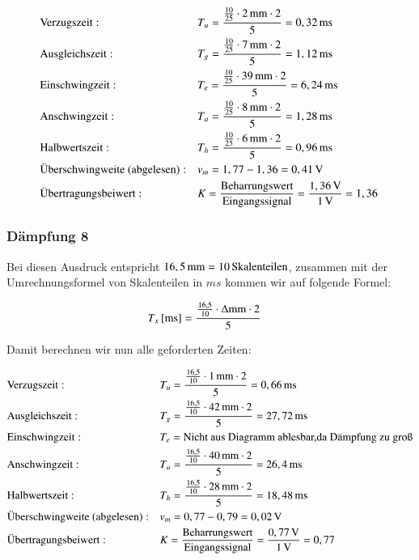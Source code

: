 \begin{align*}
&\text{Verzugszeit}:  &&T_u = \frac{ \frac{10}{25} \cdot \unit[2]{mm} \cdot 2}{5} = \unit[0,32]{ms} \\
&\text{Ausgleichszeit}:  &&T_g = \frac{ \frac{10}{25} \cdot \unit[7]{mm} \cdot 2}{5} = \unit[1,12]{ms} \\
&\text{Einschwingzeit}:  &&T_e = \frac{ \frac{10}{25} \cdot \unit[39]{mm} \cdot 2}{5} = \unit[6,24]{ms} \\
&\text{Anschwingzeit}:  &&T_a = \frac{ \frac{10}{25} \cdot \unit[8]{mm} \cdot 2}{5} = \unit[1,28]{ms} \\
&\text{Halbwertszeit}:  &&T_h = \frac{ \frac{10}{25} \cdot \unit[6]{mm} \cdot 2}{5} = \unit[0,96]{ms} \\
&\text{Überschwingweite (abgelesen)}:  &&v_m = 1,77 - 1,36 = \unit[0,41]{V} \\
&\text{Übertragungsbeiwert}:  &&K = \frac{\text{Beharrungswert}}{\text{Eingangssignal}} = \frac{\unit[1,36]{V}}{\unit[1]{V}} = \unit[1,36]{ } \\
\end{align*}


\newpage

\subsubsection*{Dämpfung 8}


Bei diesen Ausdruck entspricht $\unit[16,5]{mm} = \unit[10]{Skalenteilen}$, zusammen mit der Umrechnungsformel von Skalenteilen in $ms$ kommen wir auf folgende Formel:

\begin{align*}
\unit[T_x]{[ms]} &= \frac{ \frac{16,5}{10} \cdot \Delta \text{mm} \cdot 2}{5}
\end{align*}

Damit berechnen wir nun alle geforderten Zeiten:

\begin{align*}
&\text{Verzugszeit}:  &&T_u = \frac{ \frac{16,5}{10} \cdot \unit[1]{mm} \cdot 2}{5} = \unit[0,66]{ms} \\
&\text{Ausgleichszeit}:  &&T_g = \frac{ \frac{16,5}{10} \cdot \unit[42]{mm} \cdot 2}{5} = \unit[27,72]{ms} \\
&\text{Einschwingzeit}:  &&T_e = \text{Nicht aus Diagramm ablesbar,da Dämpfung zu groß} \\
&\text{Anschwingzeit}:  &&T_a = \frac{ \frac{16,5}{10} \cdot \unit[40]{mm} \cdot 2}{5} = \unit[26,4]{ms} \\
&\text{Halbwertszeit}:  &&T_h = \frac{ \frac{16,5}{10} \cdot \unit[28]{mm} \cdot 2}{5} = \unit[18,48]{ms} \\
&\text{Überschwingweite (abgelesen)}:  &&v_m = 0,77 - 0,79 = \unit[0,02]{V} \\
&\text{Übertragungsbeiwert}:  &&K = \frac{\text{Beharrungswert}}{\text{Eingangssignal}} = \frac{\unit[0,77]{V}}{\unit[1]{V}} = \unit[0,77]{ } \\
\end{align*}

